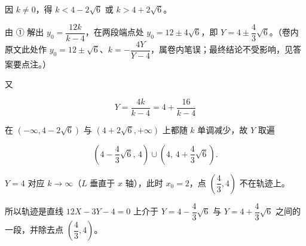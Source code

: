 \begin{answer}
因 $k\ne 0$，得 $k<4-2\sqrt{6}$ 或 $k>4+2\sqrt{6}$。

由 ① 解出 $y_{0}=\dfrac{12k}{k-4}$，在两段端点处 $y_{0}=12\pm 4\sqrt{6}$，即 $Y=4\pm\dfrac{4}{3}\sqrt{6}$。（卷内原文此处作 $y_{0}=12\pm\sqrt{6}$、$k=-\dfrac{4Y}{Y-4}$，属卷内笔误；最终结论不受影响，见答案要点注。）

又

\nopagebreak[4]
\[
Y=\frac{4k}{k-4}=4+\frac{16}{k-4}
\]

在 $(-\infty,4-2\sqrt{6})$ 与 $(4+2\sqrt{6},+\infty)$ 上都随 $k$ 单调减少，故 $Y$ 取遍

\nopagebreak[4]
\[
\left(4-\frac{4}{3}\sqrt{6},\,4\right)\cup\left(4,\,4+\frac{4}{3}\sqrt{6}\right).
\]

$Y=4$ 对应 $k\to\infty$（$L$ 垂直于 $x$ 轴），此时 $x_{0}=2$，点 $\left(\dfrac{4}{3},4\right)$ 不在轨迹上。

所以轨迹是直线 $12X-3Y-4=0$ 上介于 $Y=4-\dfrac{4}{3}\sqrt{6}$ 与 $Y=4+\dfrac{4}{3}\sqrt{6}$ 之间的一段，并除去点 $\left(\dfrac{4}{3},4\right)$。


\end{answer}
